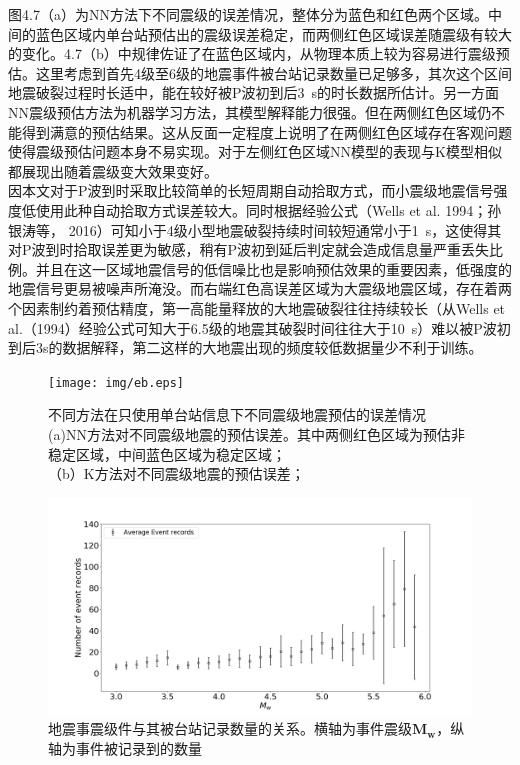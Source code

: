 \indent 图4.7（a）为NN方法下不同震级的误差情况，整体分为蓝色和红色两个区域。中间的蓝色区域内单台站预估出的震级误差稳定，而两侧红色区域误差随震级有较大的变化。4.7（b）中规律佐证了在蓝色区域内，从物理本质上较为容易进行震级预估。这里考虑到首先4级至6级的地震事件被台站记录数量已足够多，其次这个区间地震破裂过程时长适中，能在较好被P波初到后3~s的时长数据所估计。另一方面NN震级预估方法为机器学习方法，其模型解释能力很强。但在两侧红色区域仍不能得到满意的预估结果。这从反面一定程度上说明了在两侧红色区域存在客观问题使得震级预估问题本身不易实现。对于左侧红色区域NN模型的表现与K模型相似都展现出随着震级变大效果变好。\\
\indent 因本文对于P波到时采取比较简单的长短周期自动拾取方式，而小震级地震信号强度低使用此种自动拾取方式误差较大。同时根据经验公式（Wells et al. 1994；孙银涛等， 2016）可知小于4级小型地震破裂持续时间较短通常小于1~s，这使得其对P波到时拾取误差更为敏感，稍有P波初到延后判定就会造成信息量严重丢失比例。并且在这一区域地震信号的低信噪比也是影响预估效果的重要因素，低强度的地震信号更易被噪声所淹没。而右端红色高误差区域为大震级地震区域，存在着两个因素制约着预估精度，第一高能量释放的大地震破裂往往持续较长（从Wells et al.（1994）经验公式可知大于6.5级的地震其破裂时间往往大于10~s）难以被P波初到后3s的数据解释，第二这样的大地震出现的频度较低数据量少不利于训练。\\
\begin{figure}[!h]%
	\centering  %
	\texttt{[image: img/eb.eps]}  %
	\caption{不同方法在只使用单台站信息下不同震级地震预估的误差情况\\
(a)NN方法对不同震级地震的预估误差。其中两侧红色区域为预估非稳定区域，中间蓝色区域为稳定区域；\\
（b）K方法对不同震级地震的预估误差；}  %
	\label{fig:mcmthesis-logo}   %
\end{figure}
\begin{figure}[!h]%
	\centering  %
	\includegraphics[width=\linewidth]{img/M-N.png}  %
	\caption{地震事震级件与其被台站记录数量的关系。横轴为事件震级$\mathbf{M}_{\mathbf{w}}$，纵轴为事件被记录到的数量}  %
	\label{fig:mcmthesis-logo}   %
\end{figure}

